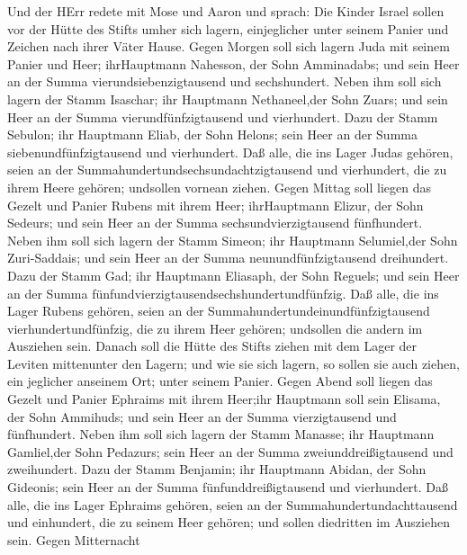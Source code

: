  Und der HErr redete mit Mose und Aaron und sprach:
 Die Kinder Israel sollen vor der Hütte des Stifts umher
sich lagern, einjeglicher unter seinem Panier und Zeichen nach ihrer
Väter Hause.  Gegen Morgen soll sich lagern Juda mit seinem
Panier und Heer; ihrHauptmann Nahesson, der Sohn Amminadabs;
 und sein Heer an der Summa vierundsiebenzigtausend und
sechshundert.  Neben ihm soll sich lagern der Stamm
Isaschar; ihr Hauptmann Nethaneel,der Sohn Zuars;  und sein
Heer an der Summa vierundfünfzigtausend und vierhundert. 
Dazu der Stamm Sebulon; ihr Hauptmann Eliab, der Sohn Helons;
 sein Heer an der Summa siebenundfünfzigtausend und
vierhundert.  Daß alle, die ins Lager Judas gehören, seien
an der Summahundertundsechsundachtzigtausend und vierhundert, die zu
ihrem Heere gehören; undsollen vornean ziehen.  Gegen
Mittag soll liegen das Gezelt und Panier Rubens mit ihrem Heer;
ihrHauptmann Elizur, der Sohn Sedeurs;  und sein Heer an
der Summa sechsundvierzigtausend fünfhundert.  Neben ihm
soll sich lagern der Stamm Simeon; ihr Hauptmann Selumiel,der Sohn
Zuri-Saddais;  und sein Heer an der Summa
neunundfünfzigtausend dreihundert.  Dazu der Stamm Gad; ihr
Hauptmann Eliasaph, der Sohn Reguels;  und sein Heer an der
Summa fünfundvierzigtausendsechshundertundfünfzig.  Daß
alle, die ins Lager Rubens gehören, seien an der
Summahundertundeinundfünfzigtausend vierhundertundfünfzig, die zu ihrem
Heer gehören; undsollen die andern im Ausziehen sein. 
Danach soll die Hütte des Stifts ziehen mit dem Lager der Leviten
mittenunter den Lagern; und wie sie sich lagern, so sollen sie auch
ziehen, ein jeglicher anseinem Ort; unter seinem Panier. 
Gegen Abend soll liegen das Gezelt und Panier Ephraims mit ihrem
Heer;ihr Hauptmann soll sein Elisama, der Sohn Ammihuds; 
und sein Heer an der Summa vierzigtausend und fünfhundert. 
Neben ihm soll sich lagern der Stamm Manasse; ihr Hauptmann Gamliel,der
Sohn Pedazurs;  sein Heer an der Summa
zweiunddreißigtausend und zweihundert.  Dazu der Stamm
Benjamin; ihr Hauptmann Abidan, der Sohn Gideonis;  sein
Heer an der Summa fünfunddreißigtausend und vierhundert. 
Daß alle, die ins Lager Ephraims gehören, seien an der
Summahundertundachttausend und einhundert, die zu seinem Heer gehören;
und sollen diedritten im Ausziehen sein.  Gegen Mitternacht

